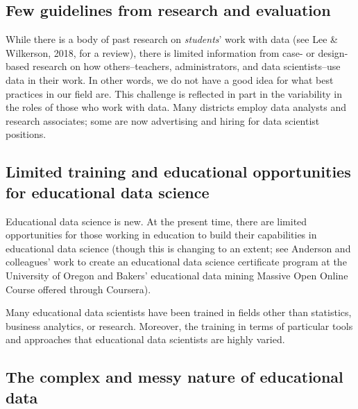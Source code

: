 \documentclass[]{book}
\begin{document}
\subsection{Few guidelines from research and
evaluation}\label{few-guidelines-from-research-and-evaluation}

While there is a body of past research on \emph{students}' work with
data (see Lee \& Wilkerson, 2018, for a review), there is limited
information from case- or design-based research on how others--teachers,
administrators, and data scientists--use data in their work. In other
words, we do not have a good idea for what best practices in our field
are. This challenge is reflected in part in the variability in the roles
of those who work with data. Many districts employ data analysts and
research associates; some are now advertising and hiring for data
scientist positions.

\subsection{Limited training and educational opportunities for
educational data
science}\label{limited-training-and-educational-opportunities-for-educational-data-science}

Educational data science is new. At the present time, there are limited
opportunities for those working in education to build their capabilities
in educational data science (though this is changing to an extent; see
Anderson and colleagues' work to create an educational data science
certificate program at the University of Oregon and Bakers' educational
data mining Massive Open Online Course offered through Coursera).

Many educational data scientists have been trained in fields other than
statistics, business analytics, or research. Moreover, the training in
terms of particular tools and approaches that educational data
scientists are highly varied.

\subsection{The complex and messy nature of educational
data}\label{the-complex-and-messy-nature-of-educational-data}
\end{document}
